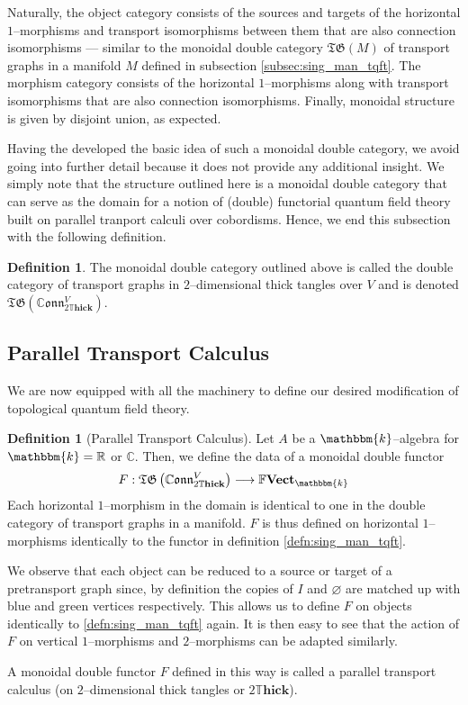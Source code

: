 \documentclass{amsart}
\newcommand{\R}{\mathbb{R}}
\newcommand{\C}{\mathbb{C}}
\newcommand{\K}{\mathbbm{k}}
\renewcommand{\to}[1][]{\stackrel{#1}{\longrightarrow}}
\newcommand{\br}[1]{\left( #1 \right)}
\newcommand{\FFVect}{\mathbb{F}\textbf{Vect}}
\newcommand{\DThick}{2\mathbb{T}\mathbf{hick}}
\newcommand{\TG}{\mathfrak{TG}}
\newcommand{\CConn}{\mathbb{C}\mathfrak{onn}}
\numberwithin{thm}{section}
\theoremstyle{definition}
\newtheorem{defn}[thm]{Definition}
\begin{document}
Naturally, the object category consists of the sources and targets of the
horizontal $1$--morphisms and transport isomorphisms between them that are also
connection isomorphisms --- similar to the monoidal double category $\TG(M)$ of
transport graphs in a manifold $M$ defined in subsection
\ref{subsec:sing_man_tqft}. The morphism category consists of the horizontal
$1$--morphisms along with transport isomorphisms that are also connection
isomorphisms. Finally, monoidal structure is given by disjoint union, as
expected.

Having the developed the basic idea of such a monoidal double category, we avoid
going into further detail because it does not provide any additional insight. We
simply note that the structure outlined here is a monoidal double category that
can serve as the domain for a notion of (double) functorial quantum field
theory built on parallel tranport calculi over cobordisms.
Hence, we end this subsection with the following definition.

\begin{defn}
The monoidal double category outlined above is called the double category of
transport graphs in $2$--dimensional thick tangles over $V$ and is
denoted $\TG\br{\CConn^V_{\DThick}}$.
\end{defn}


%

\subsection{Parallel Transport Calculus}

We are now equipped with all the machinery to define our desired modification
of topological quantum field theory.

\begin{defn}[Parallel Transport Calculus]
Let $A$ be a $\K$--algebra for $\K = \R$ or $\C$. Then, we define the data of a
monoidal double functor
\[
  F : \TG\br{\CConn^V_{\DThick}} \to \FFVect_{\K}
\]
Each horizontal $1$--morphism in the domain is identical to one in the
double category of transport graphs in a manifold. $F$ is thus defined on
horizontal $1$--morphisms identically to the functor in definition
\ref{defn:sing_man_tqft}.

We observe that each object can be reduced to a source or target of a
pretransport graph since, by definition the copies of $I$ and $\varnothing$ are
matched up with blue and green vertices respectively. This allows us to define
$F$ on objects identically to \ref{defn:sing_man_tqft} again. It is then easy to
see that the action of $F$ on vertical $1$--morphisms and $2$--morphisms can be
adapted similarly.

A monoidal double functor $F$ defined in this way is called a parallel transport
calculus (on $2$--dimensional thick tangles or $\DThick$).
\end{defn}
\end{document}
